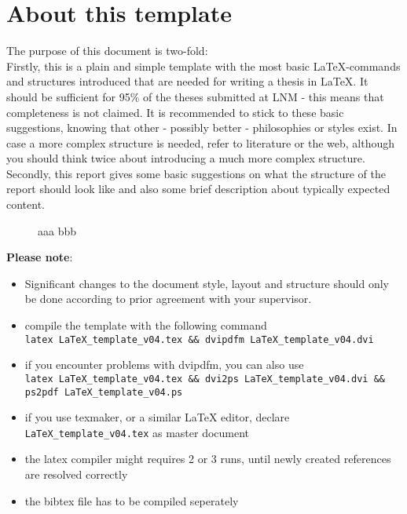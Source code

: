 \documentclass[../main.tex]{subfiles}
\begin{document}
\chapter{About this template}\label{sec:about}

The purpose of this document is two-fold:\\
Firstly, this is a plain and simple template with the most basic \LaTeX-commands and
structures introduced that are
needed for writing a thesis in \LaTeX. It should be sufficient for 95\% of
the theses submitted at LNM - this means that completeness is not claimed. It is recommended to
stick to these basic suggestions, knowing that other - possibly better -
philosophies or styles exist. In case a more complex structure is needed, refer to literature or the web, although you should think
twice about introducing a much more complex structure. \\
Secondly, this report gives some basic suggestions on what the structure of the report should look like and also some brief description about typically expected content.\\

\begin{figure}[h!]
	\begin{center}
        \caption[aaa]{aaa bbb}
		\label{aaa}
    \end{center}
\end{figure}

%
%

\textbf{Please note}: 
\begin{itemize}
 \item Significant changes to the document style, layout and structure should only be done according to prior agreement with your supervisor.
 \item compile the template with the following command \\
 \verb|latex LaTeX_template_v04.tex && dvipdfm LaTeX_template_v04.dvi|
 \item if you encounter problems with dvipdfm, you can also use \\
 \verb|latex LaTeX_template_v04.tex && dvi2ps LaTeX_template_v04.dvi &&|\\
 \verb|ps2pdf LaTeX_template_v04.ps| \\
 \item if you use texmaker, or a similar LaTeX editor, declare \verb|LaTeX_template_v04.tex| as master document   \\
 \item the latex compiler might requires 2 or 3 runs, until newly created references are resolved correctly \\
 \item the bibtex file has to be compiled seperately
\end{itemize}
\end{document}
